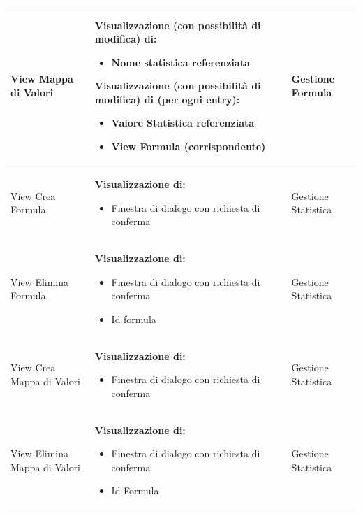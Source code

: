 \documentclass[a4paper, 11pt]{article}
\begin{document}
\begin{adjustwidth}{-1.5cm}{-1.5cm}
\begin{center}
\begin{longtable}{|p{5cm}|p{5cm}|p{5cm}|}
        View Mappa di Valori & 
        \textbf{Visualizzazione (con possibilità di modifica) di:}
        \begin{itemize}
            \item Nome statistica referenziata
        \end{itemize}
        \textbf{Visualizzazione (con possibilità di modifica) di (per ogni entry):}
        \begin{itemize}
           \item Valore Statistica referenziata
            \item View Formula (corrispondente)
        \end{itemize} & Gestione Formula
        \\ \hline

        View Crea Formula  & 
        \textbf{Visualizzazione di:}
        \begin{itemize}
            \item Finestra di dialogo con richiesta di conferma
        \end{itemize} & Gestione Statistica
        \\ \hline

        View Elimina Formula  & 
        \textbf{Visualizzazione di:}
        \begin{itemize}
            \item Finestra di dialogo con richiesta di conferma
            \item Id formula
        \end{itemize} & Gestione Statistica
        \\ \hline 

        View Crea Mappa di Valori & 
        \textbf{Visualizzazione di:}
        \begin{itemize}
            \item Finestra di dialogo con richiesta di conferma
        \end{itemize} & Gestione Statistica
        \\ \hline

        View Elimina Mappa di Valori & 
        \textbf{Visualizzazione di:}
        \begin{itemize}
            \item Finestra di dialogo con richiesta di conferma
            \item Id Formula
        \end{itemize} & Gestione Statistica
        \\ \hline
        

\end{longtable}
\end{center}
\end{adjustwidth}
\end{document}
